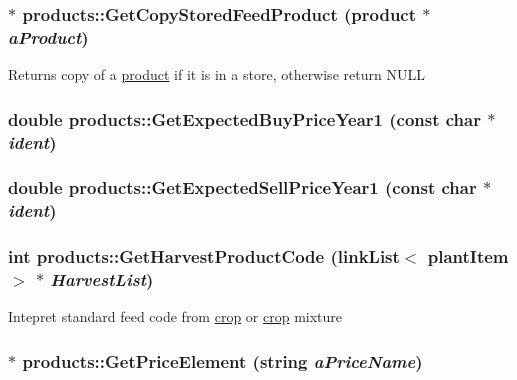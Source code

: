 \label{classproducts_a7d77ad348aa0f59a569c5c2debda2052}
\hypertarget{classproducts_ac13e4e332916d2e8b6d0f6bf04cadc4d}{
\subsubsection[{GetCopyStoredFeedProduct}]{ $\ast$ products::GetCopyStoredFeedProduct ({\bf product} $\ast$ {\em aProduct})}}
\label{classproducts_ac13e4e332916d2e8b6d0f6bf04cadc4d}
Returns copy of a \hyperlink{classproduct}{product} if it is in a store, otherwise return NULL \hypertarget{classproducts_aca468b27ede7c7abfb58d543acd78f5e}{
\subsubsection[{GetExpectedBuyPriceYear1}]{\setlength{\rightskip}{0pt plus 5cm}double products::GetExpectedBuyPriceYear1 (const char $\ast$ {\em ident})}}
\label{classproducts_aca468b27ede7c7abfb58d543acd78f5e}
\hypertarget{classproducts_ae122edd26460705dc0c598c8ce8cf488}{
\subsubsection[{GetExpectedSellPriceYear1}]{\setlength{\rightskip}{0pt plus 5cm}double products::GetExpectedSellPriceYear1 (const char $\ast$ {\em ident})}}
\label{classproducts_ae122edd26460705dc0c598c8ce8cf488}
\hypertarget{classproducts_a17077e1bcda62eee96530b9b4e8b0a10}{
\subsubsection[{GetHarvestProductCode}]{\setlength{\rightskip}{0pt plus 5cm}int products::GetHarvestProductCode ({\bf linkList}$<$ {\bf plantItem} $>$ $\ast$ {\em HarvestList})}}
\label{classproducts_a17077e1bcda62eee96530b9b4e8b0a10}
Intepret standard feed code from \hyperlink{classcrop}{crop} or \hyperlink{classcrop}{crop} mixture \hypertarget{classproducts_a3a34b70e01258e1a19d8c68010c41d83}{
\subsubsection[{GetPriceElement}]{ $\ast$ products::GetPriceElement (string {\em aPriceName})}}

